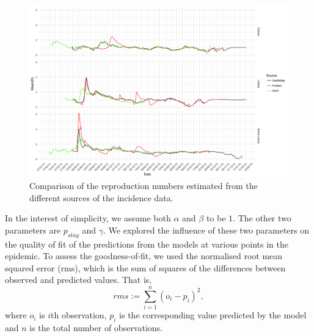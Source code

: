 \documentclass[11pt,]{article}
\begin{document}
\begin{figure}
  \centering
  \includegraphics[width=\textwidth]{ms6-figures/who_vs_hm_vs_pm-R}
  \caption{Comparison of the reproduction numbers estimated from
        the different sources of the incidence data.}
  \label{fig:r_comp}
\end{figure}


In the interest of simplicity, we assume both
$\alpha$ and $\beta$ to be $1$. The other two parameters are
$p_{stay}$ and $\gamma$. We explored the influence of these two
parameters on the quality of fit of the predictions from the models at various points in the
epidemic. To assess the goodness-of-fit, we used the normalised root mean squared
error (rms), which is the sum of squares of the differences between
observed and predicted values. That is, 
\[ rms := \sum_{i = 1}^n{\left(o_i - p_i\right)^2},\]
where $o_i$ is $i$th observation, $p_i$ is the corresponding value
predicted by the model and $n$ is the total number of observations.
\end{document}

